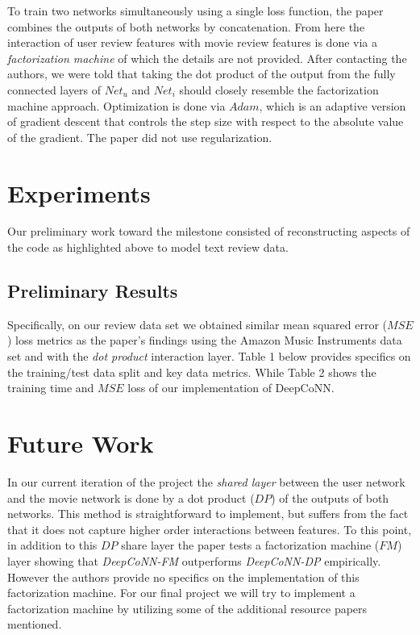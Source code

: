 \documentclass[10pt,twocolumn,letterpaper]{article}
\begin{document}
To train two networks simultaneously using a single loss function, the paper combines the outputs of both networks by concatenation. From here the interaction of user review features with movie review features is done via a \textit{factorization machine} of which the details are not provided. After contacting the authors, we were told that taking the dot product of the output from the fully connected layers of $Net_{u}$ and $Net_{i}$ should closely resemble the factorization machine approach. Optimization is done via $Adam$, which is an adaptive version of gradient descent that controls the step size with respect to the absolute value of the gradient. The paper did not use regularization.

\section{Experiments}

Our preliminary work toward the milestone consisted of reconstructing aspects of the code as highlighted above to model text review data.  

\subsection{Preliminary Results}
Specifically, on our review data set we obtained similar mean squared error ($MSE$) loss metrics as the paper's findings using the Amazon Music Instruments data set and with the \textit{dot product} interaction layer. Table 1 below provides specifics on the training/test data split and key data metrics. While Table 2 shows the training time and $MSE$ loss of our implementation of DeepCoNN.

\section{Future Work}

In our current iteration of the project the \textit{shared layer} between the user network and the movie network is done by a dot product ($DP$) of the outputs of both networks. This method is straightforward to implement, but suffers from the fact that it does not capture higher order interactions between features. To this point, in addition to this $DP$ share layer the paper tests a factorization machine ($FM$) layer showing that \textit{DeepCoNN-FM} outperforms \textit{DeepCoNN-DP} empirically. However the authors provide no specifics on the implementation of this factorization machine. For our final project we will try to implement a factorization machine by utilizing some of the additional resource papers mentioned.
\end{document}
